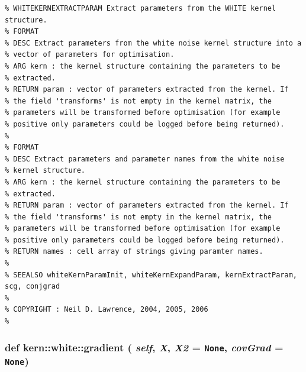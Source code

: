 \footnotesize\begin{verbatim}% WHITEKERNEXTRACTPARAM Extract parameters from the WHITE kernel structure.
% FORMAT
% DESC Extract parameters from the white noise kernel structure into a
% vector of parameters for optimisation.
% ARG kern : the kernel structure containing the parameters to be
% extracted.
% RETURN param : vector of parameters extracted from the kernel. If
% the field 'transforms' is not empty in the kernel matrix, the
% parameters will be transformed before optimisation (for example
% positive only parameters could be logged before being returned).
%
% FORMAT
% DESC Extract parameters and parameter names from the white noise
% kernel structure.
% ARG kern : the kernel structure containing the parameters to be
% extracted.
% RETURN param : vector of parameters extracted from the kernel. If
% the field 'transforms' is not empty in the kernel matrix, the
% parameters will be transformed before optimisation (for example
% positive only parameters could be logged before being returned).
% RETURN names : cell array of strings giving paramter names.
%
% SEEALSO whiteKernParamInit, whiteKernExpandParam, kernExtractParam, scg, conjgrad
%
% COPYRIGHT : Neil D. Lawrence, 2004, 2005, 2006
%
\end{verbatim}
\normalsize
 \hypertarget{classkern_1_1white_e9f2b22e87fdf88c17187a3eb31f76a6}{
\subsubsection[{gradient}]{\setlength{\rightskip}{0pt plus 5cm}def kern::white::gradient ( {\em self}, \/   {\em X}, \/   {\em X2} = {\tt None}, \/   {\em covGrad} = {\tt None})}}
\label{classkern_1_1white_e9f2b22e87fdf88c17187a3eb31f76a6}




